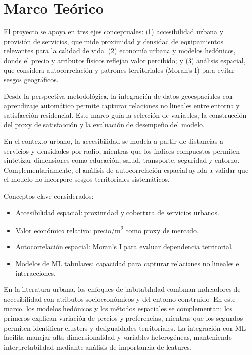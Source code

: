 \documentclass[11pt,letterpaper]{article}
\begin{document}
\section{Marco Teórico}

El proyecto se apoya en tres ejes conceptuales: (1) accesibilidad urbana y provisión de servicios, que mide proximidad y densidad de equipamientos relevantes para la calidad de vida; (2) economía urbana y modelos hedónicos, donde el precio y atributos físicos reflejan valor percibido; y (3) análisis espacial, que considera autocorrelación y patrones territoriales (Moran's I) para evitar sesgos geográficos.

Desde la perspectiva metodológica, la integración de datos geoespaciales con aprendizaje automático permite capturar relaciones no lineales entre entorno y satisfacción residencial. Este marco guía la selección de variables, la construcción del proxy de satisfacción y la evaluación de desempeño del modelo.

En el contexto urbano, la accesibilidad se modela a partir de distancias a servicios y densidades por radio, mientras que los índices compuestos permiten sintetizar dimensiones como educación, salud, transporte, seguridad y entorno. Complementariamente, el análisis de autocorrelación espacial ayuda a validar que el modelo no incorpore sesgos territoriales sistemáticos.

Conceptos clave considerados:
\begin{itemize}
    \item Accesibilidad espacial: proximidad y cobertura de servicios urbanos.
    \item Valor económico relativo: precio/m\textsuperscript{2} como proxy de mercado.
    \item Autocorrelación espacial: Moran's I para evaluar dependencia territorial.
    \item Modelos de ML tabulares: capacidad para capturar relaciones no lineales e interacciones.
\end{itemize}

En la literatura urbana, los enfoques de habitabilidad combinan indicadores de accesibilidad con atributos socioeconómicos y del entorno construido. En este marco, los modelos hedónicos y los métodos espaciales se complementan: los primeros explican variación de precios y preferencias, mientras que los segundos permiten identificar clusters y desigualdades territoriales. La integración con ML facilita manejar alta dimensionalidad y variables heterogéneas, manteniendo interpretabilidad mediante análisis de importancia de features.
\end{document}
